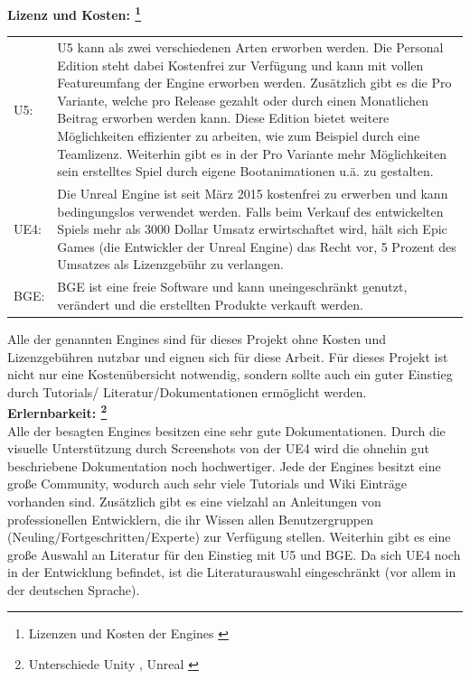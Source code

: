 \textbf{Lizenz und Kosten: \footnote{Lizenzen und Kosten der Engines\cite{epicgames2015engine} \cite{unitytechnologies2015get} \cite{blender.org2007license}}}
\begin{table}[H]
\centering
\renewcommand{\arraystretch}{1.5}
\begin{tabular}{lp{14.5cm}}
\ac{U5}:   & \ac{U5} kann als zwei verschiedenen Arten erworben werden. Die Personal Edition steht dabei Kostenfrei zur Verfügung und kann mit vollen Featureumfang der Engine erworben werden. Zusätzlich gibt es die Pro Variante, welche pro Release gezahlt oder durch einen Monatlichen Beitrag erworben werden kann. Diese Edition bietet weitere Möglichkeiten effizienter zu arbeiten, wie zum Beispiel durch eine Teamlizenz. Weiterhin gibt es in der Pro Variante mehr Möglichkeiten sein erstelltes Spiel durch eigene Bootanimationen u.ä. zu gestalten.\\
UE4:  & Die Unreal Engine ist seit März 2015 kostenfrei zu erwerben und kann bedingungslos verwendet werden. Falls beim Verkauf des entwickelten Spiels mehr als 3000 Dollar Umsatz erwirtschaftet wird, hält sich Epic Games (die Entwickler der Unreal Engine) das Recht vor, 5 Prozent des Umsatzes als Lizenzgebühr zu  verlangen.\\
\ac{BGE}:  & \ac{BGE} ist eine freie Software  und kann uneingeschränkt genutzt, verändert und die erstellten Produkte verkauft werden.
\end{tabular}
\end{table}
Alle der genannten Engines sind für dieses Projekt ohne Kosten und Lizenzgebühren nutzbar und eignen sich für diese Arbeit.
Für dieses Projekt ist nicht nur eine Kostenübersicht notwendig, sondern sollte auch ein guter Einstieg durch Tutorials/ Literatur/Dokumentationen ermöglicht werden.\\

\textbf{Erlernbarkeit: \footnote{ Unterschiede Unity , Unreal \cite{unityhacker2015}}}\\
Alle der besagten Engines besitzen eine sehr gute Dokumentationen. Durch die visuelle Unterstützung durch Screenshots von der \ac{UE4}  wird die ohnehin gut beschriebene Dokumentation noch hochwertiger. Jede der Engines besitzt eine große Community, wodurch auch sehr viele Tutorials und Wiki Einträge vorhanden sind. Zusätzlich gibt es eine  vielzahl an  Anleitungen von professionellen Entwicklern, die ihr Wissen allen Benutzergruppen (Neuling/Fortgeschritten/Experte) zur Verfügung stellen. Weiterhin gibt es eine große Auswahl an Literatur für den Einstieg mit \ac{U5} und \ac{BGE}. Da sich \ac{UE4} noch in der Entwicklung befindet, ist die Literaturauswahl eingeschränkt (vor allem in der deutschen Sprache).

